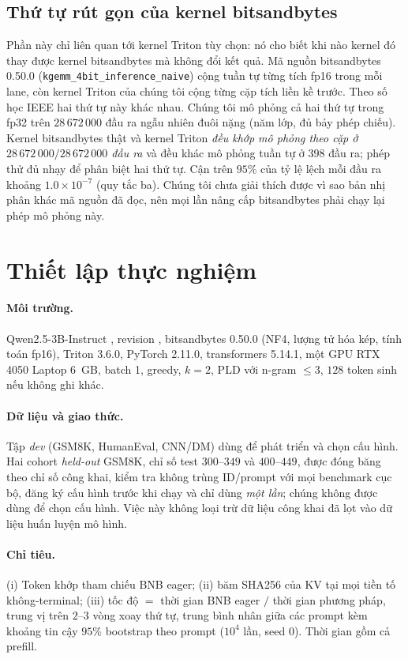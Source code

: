 \subsection{Thứ tự rút gọn của kernel bitsandbytes}\label{sec:order}
Phần này chỉ liên quan tới kernel Triton tùy chọn: nó cho biết khi nào kernel đó thay được kernel bitsandbytes mà không đổi kết quả.
Mã nguồn bitsandbytes 0.50.0 (\texttt{kgemm\_\allowbreak 4bit\_\allowbreak inference\_\allowbreak naive}) cộng tuần tự từng tích fp16 trong mỗi lane, còn kernel Triton của chúng tôi cộng từng cặp tích liền kề trước. Theo số học IEEE hai thứ tự này khác nhau. Chúng tôi mô phỏng cả hai thứ tự trong fp32 trên $28\,672\,000$ đầu ra ngẫu nhiên đuôi nặng (năm lớp, đủ bảy phép chiếu). Kernel bitsandbytes thật và kernel Triton \emph{đều khớp mô phỏng theo cặp ở $28\,672\,000/28\,672\,000$ đầu ra} và đều khác mô phỏng tuần tự ở $398$ đầu ra; phép thử đủ nhạy để phân biệt hai thứ tự. Cận trên $95\%$ của tỷ lệ lệch mỗi đầu ra khoảng $1.0\times10^{-7}$ (quy tắc ba). Chúng tôi chưa giải thích được vì sao bản nhị phân khác mã nguồn đã đọc, nên mọi lần nâng cấp bitsandbytes phải chạy lại phép mô phỏng này.

\section{Thiết lập thực nghiệm}
\paragraph{Môi trường.} Qwen2.5-3B-Instruct \cite{qwen2024qwen25}, revision , bitsandbytes 0.50.0 (NF4, lượng tử hóa kép, tính toán fp16), Triton 3.6.0, PyTorch 2.11.0, transformers 5.14.1, một GPU RTX 4050 Laptop 6~GB, batch 1, greedy, $k{=}2$, PLD với n-gram $\le 3$, $128$ token sinh nếu không ghi khác.

\paragraph{Dữ liệu và giao thức.} Tập \emph{dev} (GSM8K, HumanEval, CNN/DM) dùng để phát triển và chọn cấu hình. Hai cohort \emph{held-out} GSM8K, chỉ số test $300$--$349$ và $400$--$449$, được đóng băng theo chỉ số công khai, kiểm tra không trùng ID/prompt với mọi benchmark cục bộ, đăng ký cấu hình trước khi chạy và chỉ dùng \emph{một lần}; chúng không được dùng để chọn cấu hình. Việc này không loại trừ dữ liệu công khai đã lọt vào dữ liệu huấn luyện mô hình.

\paragraph{Chỉ tiêu.} (i) Token khớp tham chiếu BNB eager; (ii) băm SHA256 của KV tại mọi tiền tố không-terminal; (iii) tốc độ $=$ thời gian BNB eager $/$ thời gian phương pháp, trung vị trên $2$--$3$ vòng xoay thứ tự, trung bình nhân giữa các prompt kèm khoảng tin cậy $95\%$ bootstrap theo prompt ($10^4$ lần, seed 0). Thời gian gồm cả prefill.

